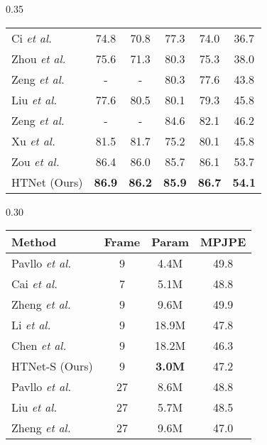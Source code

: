 \documentclass{article}
\def\VspaceTb{\vspace{-0.30cm}}
\begin{document}
\begin{table*}[t]
\begin{subtable}[t]{0.35\textwidth}
\begin{tabular}{l|ccccc}
        	Ci \textit{et al.}~\cite{ci2019optimizing}  & 74.8 &70.8 &77.3 &74.0 &36.7 \\
        	Zhou \textit{et al.}~\cite{zhou2017towards}  & 75.6 &71.3 &80.3 &75.3 &38.0 \\
            Zeng \textit{et al.}~\cite{zeng2020srnet}   &- &-  &80.3 &77.6 &43.8  \\
            Liu \textit{et al.}~\cite{liu2020attention}  &77.6 &80.5 &80.1 &79.3 &45.8 \\
            Zeng \textit{et al.}~\cite{zeng2021learning}  &- &-  &84.6 &82.1 &46.2  \\
            Xu \textit{et al.}~\cite{xu2021graph}  &81.5 &81.7 &75.2 &80.1 &45.8 \\
            Zou \textit{et al.}~\cite{mgcn} &{86.4} &{86.0} &{85.7} &{86.1} &{53.7} \\
            \midrule
            \rowcolor[HTML]{DADADA}
        	HTNet (Ours) &\textbf{86.9} &\textbf{86.2} &\textbf{85.9} &\textbf{86.7}  &\textbf{54.1}	\\
        	\bottomrule
        	\end{tabular}
            \caption{Quantitative comparison on MPI-INF-3DHP.}
        	\label{tab:3dhp}
        	\VspaceTb
     \end{subtable}
    \hfill
    \enspace
    \begin{subtable}[t]{0.30\textwidth}
            \footnotesize
            \centering
            \setlength{\tabcolsep}{0.35mm}
            \begin{tabular}{@{}l|cc|c@{}}
            \toprule
            Method & \textbf{Frame}  & \textbf{Param }& \textbf{MPJPE}  \\
            \midrule
            Pavllo \textit{et al.}~\cite{videopose} &{9}  &{4.4M} &{49.8} \\
            
            Cai \textit{et al.}~\cite{stgcn}  &{7}  &{5.1M} &{48.8} \\
            Zheng \textit{et al.}~\cite{poseformer}  &{9}  &{9.6M} &{49.9} \\
            
            Li \textit{et al.}~\cite{mhformer}  &{9}  &{18.9M} &{47.8} \\
            Chen \textit{et al.}\cite{chen2021anatomy}  &{9} &{18.2M} &{46.3} \\
            
            
            \rowcolor[HTML]{DADADA}
            HTNet-S (Ours) &{9}  &\textbf{3.0M} &47.2 \\
            \midrule
            Pavllo \textit{et al.}~\cite{videopose}  &{27}  &{8.6M} &{48.8} \\
            Liu \textit{et al.}~\cite{liu2020attention}  &{27} &{5.7M} &{48.5} \\
            Zheng \textit{et al.}~\cite{poseformer}  &{27}  &{9.6M} &{47.0} \\
            

\end{tabular}
\end{subtable}
\end{table*}
\end{document}
